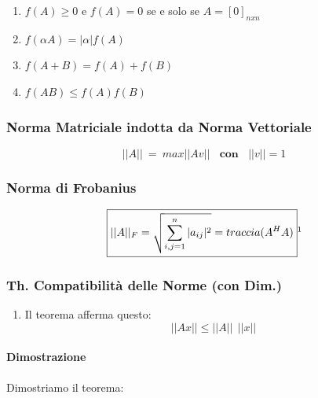 \documentclass{article}
\begin{document}
\begin{enumerate}
    \item $f(A) \geq 0$ e $f(A) = 0$ se e solo se $A = [0]_{nxn}$
    \item $f(\alpha A) = |\alpha|f(A)$
    \item $f(A+B) = f(A) + f(B)$
    \item $f(AB) \leq f(A)f(B)$
\end{enumerate}

\subsubsection{Norma Matriciale indotta da Norma Vettoriale}

\vspace*{10px}

\[ \boxed{||A|| \: = \: max||Av|| \: \: \: \: \textbf{con} \: \: \: \: ||v|| = 1} \] 

\vspace*{10px}

\subsubsection{Norma di Frobanius}

\vspace*{10px}

\[ \boxed{||A||_{F} = \sqrt{\sum^{n}_{i,j=1}|a_{ij}|^2} = traccia(A^{H}A)}\footnotemark \]


\newpage

\subsubsection{Th. Compatibilità delle Norme (con Dim.)}

\begin{enumerate}
    \item Il teorema afferma questo:
    \vspace*{10px}
    \[ \boxed{||Ax|| \leq ||A||\:\:||x||} \]
\end{enumerate}

\paragraph{Dimostrazione} Dimostriamo il teorema:
\end{document}
